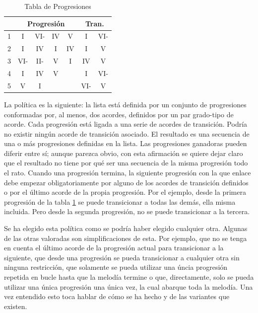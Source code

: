 \begin{table}[h]
    \centering
    \begin{tabular}{c||c|c|c|c||c|c|c|c}
        \multicolumn{1}{c}{\textbf{}} & \multicolumn{4}{c||}{\textbf{Progresión}} & \multicolumn{4}{c}{\textbf{Tran.}} \\
        \hline
        1 & I & VI- & IV & V & \multicolumn{2}{c|}{I} & \multicolumn{2}{c}{VI-} \\
        \hline       
        2 & I & IV & I & IV & \multicolumn{2}{c|}{I} & \multicolumn{2}{c}{V} \\
        \hline
        3 & VI- & II- & V & I & \multicolumn{2}{c|}{IV} & \multicolumn{2}{c}{V} \\
        \hline 
        4 & I & IV & \multicolumn{1}{c}{V} & & \multicolumn{2}{c|}{I} & \multicolumn{2}{c}{VI-} \\
        \hline 
        5 & V & \multicolumn{1}{c}{I} & \multicolumn{1}{c}{} & & \multicolumn{2}{c|}{VI-} & \multicolumn{2}{c}{V} \\

        
    \end{tabular}
    \caption{Tabla de Progresiones}
    \label{tab:progresiones}
\end{table}

La política es la siguiente: la lista está definida por un conjunto de progresiones conformadas por, al menos, dos acordes, definidos por un par grado-tipo de acorde. Cada progresión está ligada a una serie de acordes de transición. Podría no existir ningún acorde de transición asociado. El resultado es una secuencia de una o más progresiones definidas en la lista. Las progresiones ganadoras pueden diferir entre sí; aunque parezca obvio, con esta afirmación se quiere dejar claro que el resultado no tiene por qué ser una secuencia de la misma progresión todo el rato. Cuando una progresión termina, la siguiente progresión con la que enlace debe empezar obligatoriamente por alguno de los acordes de transición definidos o por el último acorde de la propia progresión. Por el ejemplo, desde la primera progresión de la tabla \ref{tab:progresiones} se puede transicionar a todas las demás, ella misma incluida. Pero desde la segunda progresión, no se puede transicionar a la tercera. 

Se ha elegido esta política como se podría haber elegido cualquier otra. Algunas de las otras valoradas son simplificaciones de esta. Por ejemplo, que no se tenga en cuenta el último acorde de la progresión actual para transicionar a la siguiente, que desde una progresión se pueda transicionar a cualquier otra sin ninguna restricción, que solamente se pueda utilizar una úncia progresión repetida en bucle hasta que la melodía termine o que, directamente, solo se pueda utilizar una única progresión una única vez, la cual abarque toda la melodía. Una vez entendido esto toca hablar de cómo se ha hecho y de las variantes que existen.

